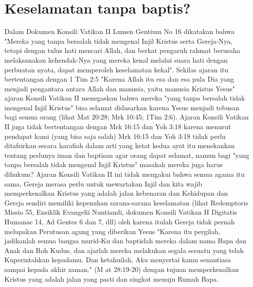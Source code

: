 \section*{Keselamatan tanpa baptis?}
Dalam Dokumen Konsili Vatikan II Lumen Gentium No 16 dikatakan bahwa "Mereka yang tanpa bersalah tidak mengenal Injil Kristus serta Gereja-Nya, tetapi dengan tulus hati mencari Allah, dan berkat pengaruh rahmat berusaha melaksanakan kehendak-Nya yang mereka kenal melalui suara hati dengan perbuatan nyata, dapat memperoleh keselamatan kekal". Sekilas ajaran itu bertentangan dengan 1 Tim 2:5 "Karena Allah itu esa dan esa pula Dia yang menjadi pengantara antara Allah dan manusia, yaitu manusia Kristus Yesus" ajaran Konsili Vatikan II menegaskan bahwa mereka "yang tanpa bersalah tidak mengenal Injil Kristus" bisa selamat didasarkan karena Yesus menjadi tebusan bagi semua orang (lihat Mat 20:28; Mrk 10:45; 1Tim 2:6). Ajaran Konsili Vatikan II juga tidak bertentangan dengan Mrk 16:15 dan Yoh 3:18 karena menurut pendapat kami (yang bisa saja salah) Mrk 16:15 dan Yoh 3:18 tidak perlu ditafsirkan secara harafiah dalam arti yang ketat kedua  ayat itu menekankan tentang perlunya iman dan baptisan agar orang dapat selamat, namun bagi "yang tanpa bersalah tidak mengenal Injil Kristus" masakah mereka juga harus dihukum? Ajaran Konsili Vatikan II ini tidak mengakui bahwa semua agama itu sama, Gereja merasa perlu untuk mewartakan Injil dan kita wajib memperkenalkan Kristus yang adalah jalan kebenaran dan Kehidupan dan Gereja sendiri memiliki kepenuhan sarana-sarana keselamatan (lihat Redemptoris Missio 55, Ensiklik Evangelii Nuntiandi, dokumen Konsili Vatikan II Digitatis Humanae 14, Ad Gentes 6 dan 7, dll) oleh karena itulah Gereja tidak pernah melupakan Perutusan agung yang diberikan Yesus "Karena itu pergilah, jadikanlah semua bangsa murid-Ku dan baptislah mereka dalam nama Bapa dan Anak dan Roh Kudus, dan ajarlah mereka melakukan segala sesuatu yang telah Kuperintahkan kepadamu. Dan ketahuilah, Aku menyertai kamu senantiasa sampai kepada akhir zaman." (M at 28:19-20) dengan tujuan memperkenalkan Kristus yang adalah jalan yang pasti dan singkat menuju Rumah Bapa.

